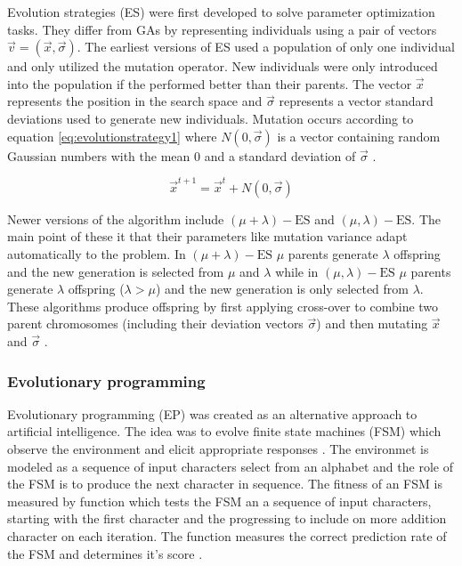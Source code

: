 Evolution strategies (ES) were first developed to solve parameter optimization tasks. They differ from GAs by representing individuals using a pair of vectors $\vec{v} = (\vec{x},\vec{\sigma})$. The earliest versions of ES used a population of only one individual and only utilized the mutation operator. New individuals were only introduced into the population if the performed better than their parents. The vector $\vec{x}$ represents the position in the search space and $\vec{\sigma}$ represents a vector standard deviations used to generate new individuals. Mutation occurs according to equation \ref{eq:evolutionstrategy1} where $N(0,\vec{\sigma})$ is a vector containing random Gaussian numbers with the mean $0$ and a standard deviation of $\vec{\sigma}$ \cite{Michalewicz1997}.

\begin{equation}
  \vec{x}^{t+1} =  \vec{x}^{t} + N(0,\vec{\sigma})
  \label{eq:evolutionstrategy1}
\end{equation}

Newer versions of the algorithm include $(\mu + \lambda)-\text{ES}$ and $(\mu,\lambda)-\text{ES}$. The main point of these it that their parameters like mutation variance adapt automatically to the problem. In $(\mu + \lambda)-\text{ES}$ $\mu$ parents generate $\lambda$ offspring and the new generation is selected from $\mu$ and $\lambda$ while in $(\mu,\lambda)-\text{ES}$ $\mu$ parents generate $\lambda$ offspring ($\lambda > \mu$) and the new generation is only selected from $\lambda$. These algorithms produce offspring by first applying cross-over to combine two parent chromosomes (including their deviation vectors $\vec{\sigma}$) and then mutating $\vec{x}$ and $\vec{\sigma}$ \cite{Michalewicz1997}.

\subsubsection{Evolutionary programming}

Evolutionary programming (EP) was created as an alternative approach to artificial intelligence. The idea was to evolve finite state machines (FSM) which observe the environment and elicit appropriate responses \cite{Fogel1996}. The environmet is modeled as a sequence of input characters select from an alphabet and the role of the FSM is to produce the next character in sequence. The fitness of an FSM is measured by function which tests the FSM an a sequence of input characters, starting with the first character and the progressing to include on more addition character on each iteration. The function measures the correct prediction rate of the FSM and determines it's score \cite{Michalewicz1997}.

